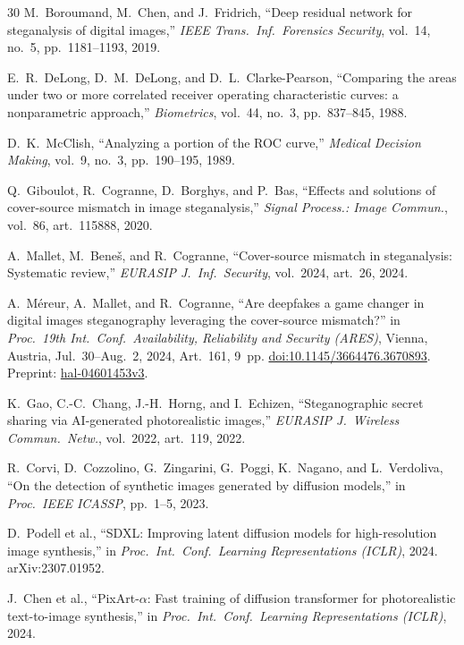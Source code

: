 \documentclass[10pt,twocolumn,a4paper]{article}
\begin{document}
\begin{thebibliography}{30}
M.~Boroumand, M.~Chen, and J.~Fridrich,
``Deep residual network for steganalysis of digital images,''
\textit{IEEE Trans.\ Inf.\ Forensics Security}, vol.~14, no.~5, pp.~1181--1193, 2019.

E.~R.~DeLong, D.~M.~DeLong, and D.~L.~Clarke-Pearson,
``Comparing the areas under two or more correlated receiver operating characteristic curves: a nonparametric approach,''
\textit{Biometrics}, vol.~44, no.~3, pp.~837--845, 1988.

D.~K.~McClish,
``Analyzing a portion of the ROC curve,''
\textit{Medical Decision Making}, vol.~9, no.~3, pp.~190--195, 1989.

Q.~Giboulot, R.~Cogranne, D.~Borghys, and P.~Bas,
``Effects and solutions of cover-source mismatch in image steganalysis,''
\textit{Signal Process.: Image Commun.}, vol.~86, art.~115888, 2020.

A.~Mallet, M.~Bene\v{s}, and R.~Cogranne,
``Cover-source mismatch in steganalysis: Systematic review,''
\textit{EURASIP J.\ Inf.\ Security}, vol.~2024, art.~26, 2024.

A.~M\'{e}reur, A.~Mallet, and R.~Cogranne,
``Are deepfakes a game changer in digital images steganography leveraging the cover-source mismatch?''
in \textit{Proc.\ 19th Int.\ Conf.\ Availability, Reliability and Security (ARES)},
Vienna, Austria, Jul.~30--Aug.~2, 2024, Art.~161, 9~pp.
\href{https://doi.org/10.1145/3664476.3670893}{doi:10.1145/3664476.3670893}.
Preprint: \href{https://hal.science/hal-04601453v3/document}{hal-04601453v3}.

K.~Gao, C.-C.~Chang, J.-H.~Horng, and I.~Echizen,
``Steganographic secret sharing via AI-generated photorealistic images,''
\textit{EURASIP J.\ Wireless Commun.\ Netw.}, vol.~2022, art.~119, 2022.

R.~Corvi, D.~Cozzolino, G.~Zingarini, G.~Poggi, K.~Nagano, and L.~Verdoliva,
``On the detection of synthetic images generated by diffusion models,''
in \textit{Proc.\ IEEE ICASSP}, pp.~1--5, 2023.

D.~Podell et al.,
``SDXL: Improving latent diffusion models for high-resolution image synthesis,''
in \textit{Proc.\ Int.\ Conf.\ Learning Representations (ICLR)}, 2024.
arXiv:2307.01952.

J.~Chen et al.,
``PixArt-$\alpha$: Fast training of diffusion transformer for photorealistic text-to-image synthesis,''
in \textit{Proc.\ Int.\ Conf.\ Learning Representations (ICLR)}, 2024.


\end{thebibliography}
\end{document}
